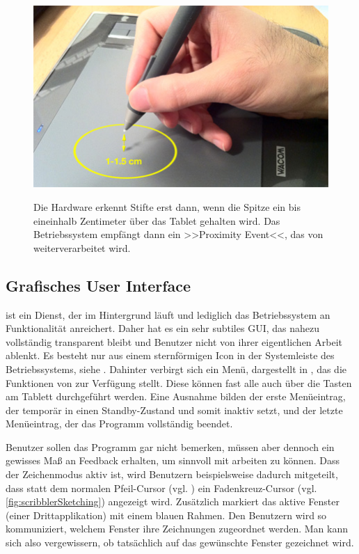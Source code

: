 \begin{figure}
        {\includegraphics[width=1\linewidth]{gfx/scribblerProximity}}
		\caption[Proximity Event]{Die Hardware erkennt Stifte erst dann, wenn die Spitze ein bis eineinhalb Zentimeter über das Tablet gehalten wird. Das Betriebssystem empfängt dann ein >>Proximity Event<<, das von \scribbler weiterverarbeitet wird.}\label{fig:scribblerProximity}
\end{figure}

\subsection{Grafisches User Interface}
\scribbler ist ein Dienst, der im Hintergrund läuft und lediglich das Betriebssystem an Funktionalität anreichert. Daher hat es ein sehr subtiles \ac{GUI}, das nahezu vollständig transparent bleibt und Benutzer nicht von ihrer eigentlichen Arbeit ablenkt. Es besteht nur aus einem sternförmigen Icon in der Systemleiste des Betriebssystems, siehe . Dahinter verbirgt sich ein Menü, dargestellt in , das die Funktionen von \scribbler zur Verfügung stellt. Diese können fast alle auch über die Tasten am Tablett durchgeführt werden. Eine Ausnahme bilden der erste Menüeintrag, der \scribbler temporär in einen Standby-Zustand und somit inaktiv setzt, und der letzte Menüeintrag, der das Programm vollständig beendet.

\medskip Benutzer sollen das Programm gar nicht bemerken, müssen aber dennoch ein gewisses Maß an Feedback erhalten, um sinnvoll mit \scribbler arbeiten zu können. Dass der Zeichenmodus aktiv ist, wird Benutzern beispielsweise dadurch mitgeteilt, dass statt dem normalen Pfeil-Cursor (vgl. ) ein Fadenkreuz-Cursor (vgl. \autoref{fig:scribblerSketching}) angezeigt wird. Zusätzlich markiert \scribbler das aktive Fenster (einer Drittapplikation) mit einem blauen Rahmen. Den Benutzern wird so kommuniziert, welchem Fenster ihre Zeichnungen zugeordnet werden. Man kann sich also vergewissern, ob tatsächlich auf das gewünschte Fenster gezeichnet wird.

